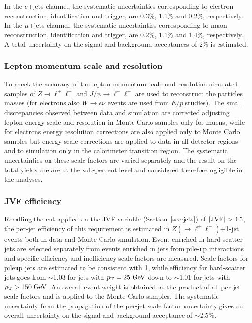 In the $e$+jets channel, the systematic uncertainties corresponding to
electron reconstruction, identification and trigger, are 0.3\%, 1.1\% 
and 0.2\%, respectively.
In the $\mu$+jets channel, the systematic uncertainties corresponding to
muon reconstruction, identification and trigger, are 0.2\%, 1.1\% and 1.4\%, 
respectively.
A total uncertainty on the signal and background acceptances of 2\% is estimated.


\subsubsection{Lepton momentum scale and resolution}

To check the accuracy of the lepton momentum scale and resolution
simulated samples of $Z\to \ell^+\ell^-$ and $J/\psi \to \ell^+\ell^-$
are used to reconstruct the particles masses (for electrons also
 $W\to e\nu$ events are used from  $E/p$  studies).
The small discrepancies observed between data and simulation are
corrected adjusting lepton energy scale and resolution in Monte Carlo
samples only for muons, while for electrons energy resolution corrections
are also applied only to Monte Carlo samples but energy scale corrections
are applied to data in all detector regions and to simulation only in 
the calorimeter transition region.
The systematic uncertainties on these scale factors are varied
separately and the result on the total yields are are at the 
sub-percent level and considered therefore ngligible in the analyses.

\subsubsection{JVF efficiency}
\label{sec:syst_jvf}

Recalling the cut applied on the JVF variable (Section~\ref{sec:jets}) 
of $|{\rm JVF}|>0.5$, the per-jet efficiency of this requirement
is estimated in $Z(\to \ell^+\ell^-)$+1-jet events both in data and
Monte Carlo simulation. Event enriched in hard-scatter jets are selected
separately from events enriched in jets from pile-up interactions and
specific efficiency and inefficiency scale factors are measured.
Scale factors for pileup jets are estimated to be consistent with 1, while
efficiency for hard-scatter jets goes from $\sim$1.03 for jets with $\pt=25\gev$
down to $\sim$1.01 for jets with $\pt>150\gev$.
An overall event weight is obtained as the product of all per-jet scale factors
and is applied to the Monte Carlo samples.
The systematic uncertainty from the propagation of the per-jet scale
factor uncertainty gives an overall uncertainty on the signal
and background acceptance of $\sim$2.5\%.


